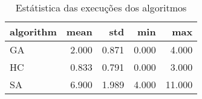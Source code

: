 \begin{table}
\caption{Estátistica das execuções dos algoritmos}
\begin{tabular}{lrrrr}
\toprule
algorithm & mean & std & min & max \\
\midrule
GA & 2.000 & 0.871 & 0.000 & 4.000 \\
HC & 0.833 & 0.791 & 0.000 & 3.000 \\
SA & 6.900 & 1.989 & 4.000 & 11.000 \\
\bottomrule
\end{tabular}
\end{table}
